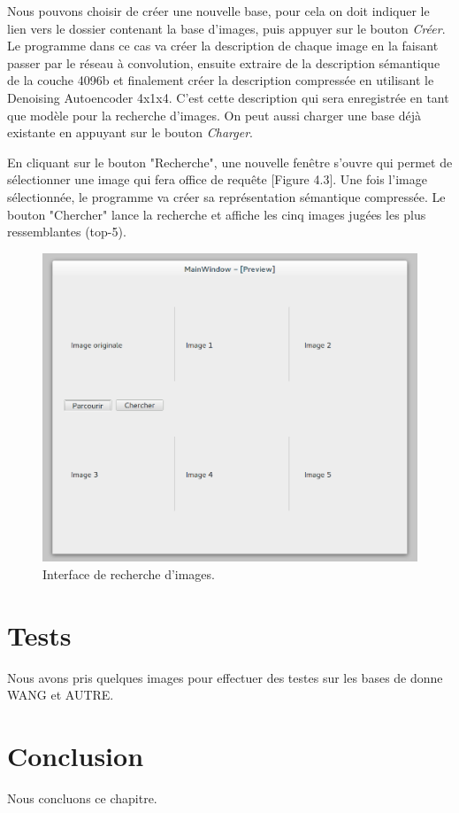 	Nous pouvons choisir de créer une nouvelle base, pour cela on doit indiquer le lien vers le dossier contenant la base d'images, puis appuyer sur le bouton \textit{Créer}. Le programme dans ce cas va créer la description de chaque image en la faisant passer par le réseau à convolution, ensuite extraire de la description sémantique de la couche 4096b et finalement créer la description compressée en utilisant le Denoising Autoencoder 4x1x4.
	C'est cette description qui sera enregistrée en tant que modèle pour la recherche d'images. On peut aussi charger une base déjà existante en appuyant sur le bouton \textit{Charger}.

	En cliquant sur le bouton "Recherche", une nouvelle fenêtre s'ouvre qui permet de sélectionner une image qui fera office de requête [Figure 4.3]. Une fois l'image sélectionnée, le programme va créer sa représentation sémantique compressée. Le bouton "Chercher" lance la recherche et affiche les cinq images jugées les plus ressemblantes (top-5).

\begin{figure}[H]
	\centering
		\includegraphics[width=5in]{Figures/search.png}
	\caption[]{Interface de recherche d'images.}
	\label{fig:Electron}
\end{figure}

\section{Tests}

Nous avons pris quelques images pour effectuer des testes sur les bases de donne WANG et AUTRE.

\section{Conclusion}

Nous concluons ce chapitre.
